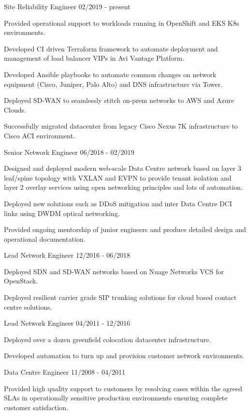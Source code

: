 \documentclass[11pt]{article} %
\begin{document}
\begin{description}
\squish
{}
           {Site Reliability Engineer}
           {02/2019 - present}

Provided operational support to workloads running in OpenShift and EKS K8s environments.

Developed CI driven Terraform framework to automate deployment and management of load balancer VIPs in Avi Vantage Platform.

Developed Ansible playbooks to automate common changes on network equipment (Cisco, Juniper, Palo Alto) and DNS infrastructure via Tower.

Deployed SD-WAN to seamlessly stitch on-prem networks to AWS and Azure Clouds.

Successfully migrated datacenter from legacy Cisco Nexus 7K infrastructure to Cisco ACI environment.

           {Senior Network Engineer}
           {06/2018 - 02/2019}

Designed and deployed modern web-scale Data Centre network based on layer 3 leaf/spine topology with VXLAN and EVPN to provide tenant isolation and layer 2 overlay services using open networking principles and lots of automation.

Deployed new solutions such as DDoS mitigation and inter Data Centre DCI links using DWDM optical networking.

Provided ongoing mentorship of junior engineers and produce detailed design and operational documentation.  
           
           {Lead Network Engineer}
           {12/2016 - 06/2018}

Deployed SDN and SD-WAN networks based on Nuage Networks VCS for OpenStack.

Deployed resilient carrier grade SIP trunking solutions for cloud based contact centre solutions. 

           {Lead Network Engineer}
           {04/2011 - 12/2016}

Deployed over a dozen greenfield colocation datacenter infrastructure.

Developed automation to turn up and provision customer network environments.

           {Data Centre Engineer}
           {11/2008 - 04/2011}

Provided high quality support to customers by resolving cases within the agreed SLAs in operationally sensitive production environments ensuring complete customer satisfaction.


\end{description}
\end{document}
